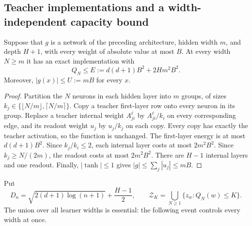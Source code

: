 \subsection{Teacher implementations and a width-independent capacity bound}

\begin{lemma}
\label{lem:gaussian-cloning}
Suppose that $g$ is a network of the preceding architecture, hidden
width $m$, and depth $H+1$, with every weight of absolute value at most
$B$.  At every width $N\geq m$ it has an exact implementation with
\begin{equation}
 Q_N\leq E:=d(d+1)B^2+2H m^2B^2.
 \label{eq:gaussian-teacher-energy}
\end{equation}
Moreover, $|g(x)|\leq U:=mB$ for every $x$.
\end{lemma}
\begin{proof}
Partition the $N$ neurons in each hidden layer into $m$ groups, of sizes
$k_j\in\{\lfloor N/m\rfloor,\lceil N/m\rceil\}$.  Copy a teacher
first-layer row onto every neuron in its group.  Replace a teacher
internal weight $A^\ell_{ji}$ by $A^\ell_{ji}/k_i$ on every corresponding
edge, and its readout weight $u_j$ by $u_j/k_j$ on each copy.  Every copy
has exactly the teacher activation, so the function is unchanged.
The first-layer energy is at most $d(d+1)B^2$.  Since $k_j/k_i\leq2$,
each internal layer costs at most $2m^2B^2$.  Since
$k_j\geq N/(2m)$, the readout costs at most $2m^2B^2$.  There are
$H-1$ internal layers and one readout.  Finally, $|\tanh|\leq1$ gives
$|g|\leq\sum_j|u_j|\leq mB$.
\end{proof}

Put
\begin{equation}
 D_n=\sqrt{2(d+1)\log(n+1)}+\frac{H-1}{2},\qquad
 \mathcal Z_K=\bigcup_{N\geq1}\{z_w:Q_N(w)\leq K\}.
 \label{eq:gaussian-Dn}
\end{equation}
The union over all learner widths is essential: the following event
controls every width at once.

